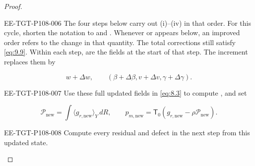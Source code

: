 \begin{proof}
\begin{EESegment}{EE-TGT-P108-006}
The four steps below carry out (i)--(iv) in that order. For this cycle, shorten the notation to
 and
. Whenever
 or  appears below, an improved order refers to
the change in that quantity. The total corrections still satisfy \eqref{eq:9.9}. Within each step,
 are the fields at the start of that step. The increment
replaces them by
\end{EESegment}
\[
w+\Delta w,
\qquad
(\beta+\Delta\beta,v+\Delta v,\gamma+\Delta\gamma).
\]
\begin{EESegment}{EE-TGT-P108-007}
Use these full updated fields in \eqref{eq:8.3} to compute
, and set
\end{EESegment}
\[
\mathcal P_{\mathrm{new}}=\int\langle g_{r,\mathrm{new}}\rangle_Y\,dR,
\qquad
p_{m,\mathrm{new}}=\mathsf T_0(g_{r,\mathrm{new}}-\rho\mathcal P_{\mathrm{new}}).
\]
\begin{EESegment}{EE-TGT-P108-008}
Compute every residual and defect in the next step from this updated state.
\end{EESegment}


\end{proof}
